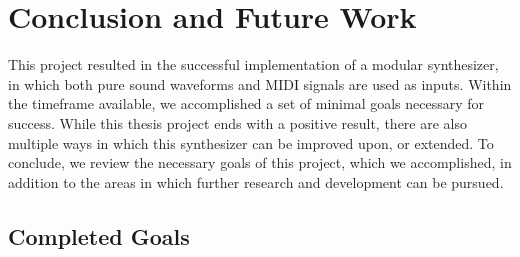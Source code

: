\chapter{Conclusion and Future Work}\label{conclusion}

This project resulted in the successful implementation of a modular synthesizer, in which both pure sound waveforms and MIDI signals are used as inputs. Within the timeframe available, we accomplished a set of minimal goals necessary for success. While this thesis project ends with a positive result, there are also multiple ways in which this synthesizer can be improved upon, or extended. To conclude, we review the necessary goals of this project, which we accomplished, in addition to the areas in which further research and development can be pursued. 

\section{Completed Goals}